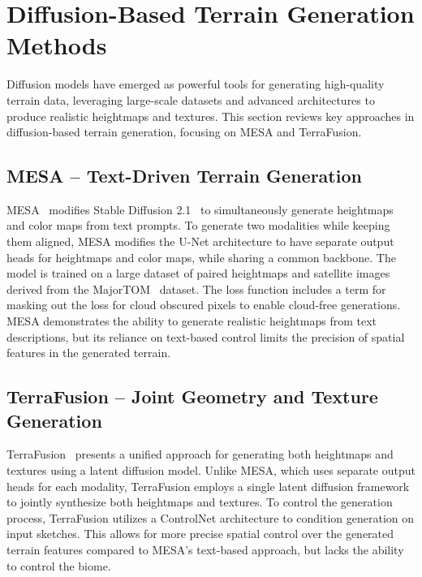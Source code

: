 \section{Diffusion-Based Terrain Generation Methods}
\label{sec:diffusion_terrain}

Diffusion models have emerged as powerful tools for generating high-quality terrain data, leveraging large-scale datasets and advanced architectures to produce realistic heightmaps and textures. This section reviews key approaches in diffusion-based terrain generation, focusing on MESA and TerraFusion.

\subsection{MESA -- Text-Driven Terrain Generation}
\label{subsec:mesa_terrain}

MESA~\cite{borne-pons2025mesa} modifies Stable Diffusion 2.1~\cite{stabilityai2022stablediffusion} to simultaneously generate heightmaps and color maps from text prompts. To generate two modalities while keeping them aligned, MESA modifies the U-Net architecture to have separate output heads for heightmaps and color maps, while sharing a common backbone. The model is trained on a large dataset of paired heightmaps and satellite images derived from the MajorTOM~\cite{schulz2024majortom} dataset. The loss function includes a term for masking out the loss for cloud obscured pixels to enable cloud-free generations. MESA demonstrates the ability to generate realistic heightmaps from text descriptions, but its reliance on text-based control limits the precision of spatial features in the generated terrain.

\subsection{TerraFusion -- Joint Geometry and Texture Generation}
\label{subsec:terra_fusion}

TerraFusion~\cite{higo2025terrafusion} presents a unified approach for generating both heightmaps and textures using a latent diffusion model. Unlike MESA, which uses separate output heads for each modality, TerraFusion employs a single latent diffusion framework to jointly synthesize both heightmaps and textures. To control the generation process, TerraFusion utilizes a ControlNet architecture to condition generation on input sketches. This allows for more precise spatial control over the generated terrain features compared to MESA's text-based approach, but lacks the ability to control the biome.
